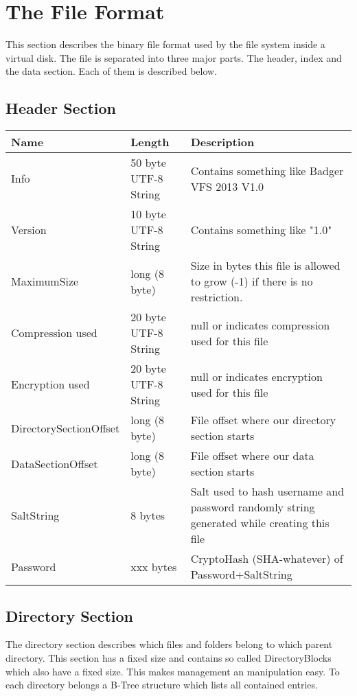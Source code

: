 
\section{The File Format}


This section describes the binary file format used by the file system inside a
virtual disk.
The file is separated into three major parts. The header, index and the data
section. Each of them is described below.

\subsection{Header Section}

\begin{tabular}{|l|l|p{5cm}|}
\hline
  \textbf{Name} & \textbf{Length} & \textbf{Description}
\\  \hline
  Info & 50 byte UTF-8 String & Contains something like Badger VFS 2013 V1.0 
\\ \hline
  Version & 10 byte UTF-8 String & Contains something like "1.0"
\\ \hline
  MaximumSize & long (8 byte) & Size in bytes this file is allowed to grow (-1) if there is no restriction. 
\\ \hline
  Compression used & 20 byte UTF-8 String & null or indicates compression used for this file
\\ \hline
  Encryption used & 20 byte UTF-8 String & null or indicates encryption used for this file
\\ \hline
 DirectorySectionOffset & long (8 byte) &  File offset where our directory section
 starts \\ \hline
 DataSectionOffset & long (8 byte) &  File offset where our data section starts
\\ \hline
 SaltString & 8 bytes  & Salt used to hash username and password randomly string generated while creating this
   file
 \\ \hline
  Password & xxx bytes  & CryptoHash (SHA-whatever) of Password+SaltString
\\ \hline

\end{tabular}


\subsection{Directory Section}

The directory section describes which files and folders belong to which parent directory. This section has a fixed size and contains so called DirectoryBlocks which also have a fixed size. This makes management an manipulation easy. To each directory belongs a B-Tree structure which lists all contained entries.


